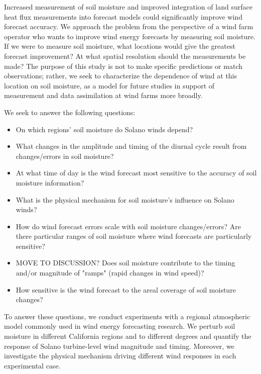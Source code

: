 Increased measurement of soil moisture and improved integration of land surface heat flux measurements into forecast models could significantly improve wind forecast accuracy.  We approach the problem from the perspective of a wind farm operator who wants to improve wind energy forecasts by measuring soil moisture.  If we were to measure soil moisture, what locations would give the greatest forecast improvement?  At what spatial resolution should the measurements be made?  The purpose of this study is not to make specific predictions or match observations; rather, we seek to characterize the dependence of wind at this location on soil moisture, as a model for future studies in support of measurement and data assimilation at wind farms more broadly.

We seek to answer the following questions:
\begin{itemize}
\item On which regions' soil moisture do Solano winds depend?
\item What changes in the amplitude and timing of the diurnal cycle result from changes/errors in soil moisture?
\item At what time of day is the wind forecast most sensitive to the accuracy of soil moisture information?
\item What is the physical mechanism for soil moisture's influence on Solano winds?
\item How do wind forecast errors scale with soil moisture changes/errors?  Are there particular ranges of soil moisture where wind forecasts are particularly sensitive?
\item MOVE TO DISCUSSION? Does soil moisture contribute to the timing and/or magnitude of "ramps" (rapid changes in wind speed)?
\item How sensitive is the wind forecast to the areal coverage of soil moisture changes?
\end{itemize}

To answer these questions, we conduct experiments with a regional atmospheric model commonly used in wind energy forecasting research.  We perturb soil moisture in different California regions and to different degrees and quantify the response of Solano turbine-level wind magnitude and timing.  Moreover, we investigate the physical mechanism driving different wind responses in each experimental case.

%